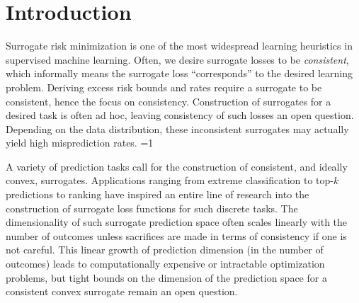 \documentclass[anon,12pt]{colt2021} %
\newcommand{\Comments}{1}
\newcommand{\mynote}[2]{\ifnum\Comments=1\textcolor{#1}{#2}\fi}
\newcommand{\mytodo}[2]{\ifnum\Comments=1%
	\todo[linecolor=#1!80!black,backgroundcolor=#1,bordercolor=#1!80!black]{#2}\fi}
\newcommand{\jessie}[1]{\mynote{purple}{[JF: #1]}}
\newcommand{\jessiet}[1]{\mytodo{purple!20!white}{JF: #1}}
\begin{document}
\section{Introduction}\label{sec:intro}
Surrogate risk minimization is one of the most widespread learning heuristics in supervised machine learning.
Often, we desire surrogate losses to be \emph{consistent}, which informally means the surrogate loss ``corresponds'' to the desired learning problem.
Deriving excess risk bounds and rates require a surrogate to be consistent, hence the focus on consistency.
Construction of surrogates for a desired task is often ad hoc, leaving consistency of such losses an open question.
Depending on the data distribution, these inconsistent surrogates may actually yield high misprediction rates. \jessiet{Clean this up.}

A variety of prediction tasks call for the construction of consistent, and ideally convex, surrogates.
Applications ranging from extreme classification to top-$k$ predictions to ranking have inspired an entire line of research into the construction of surrogate loss functions for such discrete tasks.
The dimensionality of such surrogate prediction space often scales linearly with the number of outcomes unless sacrifices are made in terms of consistency if one is not careful.
This linear growth of prediction dimension (in the number of outcomes) leads to computationally expensive or intractable optimization problems, but tight bounds on the dimension of the prediction space for a consistent convex surrogate remain an open question.
\end{document}
